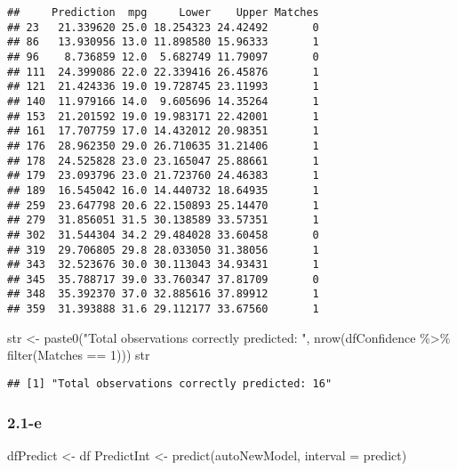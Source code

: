 \documentclass[
]{article}
\newenvironment{Shaded}{\begin{snugshade}}{\end{snugshade}}
\newcommand{\AttributeTok}[1]{\textcolor[rgb]{0.77,0.63,0.00}{#1}}
\newcommand{\DecValTok}[1]{\textcolor[rgb]{0.00,0.00,0.81}{#1}}
\newcommand{\FunctionTok}[1]{\textcolor[rgb]{0.00,0.00,0.00}{#1}}
\newcommand{\NormalTok}[1]{#1}
\newcommand{\OtherTok}[1]{\textcolor[rgb]{0.56,0.35,0.01}{#1}}
\newcommand{\SpecialCharTok}[1]{\textcolor[rgb]{0.00,0.00,0.00}{#1}}
\newcommand{\StringTok}[1]{\textcolor[rgb]{0.31,0.60,0.02}{#1}}
\begin{document}
\begin{verbatim}
##     Prediction  mpg     Lower    Upper Matches
## 23   21.339620 25.0 18.254323 24.42492       0
## 86   13.930956 13.0 11.898580 15.96333       1
## 96    8.736859 12.0  5.682749 11.79097       0
## 111  24.399086 22.0 22.339416 26.45876       1
## 121  21.424336 19.0 19.728745 23.11993       1
## 140  11.979166 14.0  9.605696 14.35264       1
## 153  21.201592 19.0 19.983171 22.42001       1
## 161  17.707759 17.0 14.432012 20.98351       1
## 176  28.962350 29.0 26.710635 31.21406       1
## 178  24.525828 23.0 23.165047 25.88661       1
## 179  23.093796 23.0 21.723760 24.46383       1
## 189  16.545042 16.0 14.440732 18.64935       1
## 259  23.647798 20.6 22.150893 25.14470       1
## 279  31.856051 31.5 30.138589 33.57351       1
## 302  31.544304 34.2 29.484028 33.60458       0
## 319  29.706805 29.8 28.033050 31.38056       1
## 343  32.523676 30.0 30.113043 34.93431       1
## 345  35.788717 39.0 33.760347 37.81709       0
## 348  35.392370 37.0 32.885616 37.89912       1
## 359  31.393888 31.6 29.112177 33.67560       1
\end{verbatim}

\begin{Shaded}
\begin{Highlighting}[]
\NormalTok{str }\OtherTok{\textless{}{-}} \FunctionTok{paste0}\NormalTok{(}\StringTok{"Total observations correctly predicted: "}\NormalTok{, }\FunctionTok{nrow}\NormalTok{(dfConfidence }\SpecialCharTok{\%\textgreater{}\%} \FunctionTok{filter}\NormalTok{(Matches }\SpecialCharTok{==} \DecValTok{1}\NormalTok{)))}
\NormalTok{str}
\end{Highlighting}
\end{Shaded}

\begin{verbatim}
## [1] "Total observations correctly predicted: 16"
\end{verbatim}

\hypertarget{e}{%
\subsubsection{2.1-e}\label{e}}

\begin{Shaded}
\begin{Highlighting}[]
\NormalTok{dfPredict }\OtherTok{\textless{}{-}}\NormalTok{ df}
\NormalTok{PredictInt }\OtherTok{\textless{}{-}} \FunctionTok{predict}\NormalTok{(autoNewModel, }\AttributeTok{interval =} \StringTok{\textquotesingle{}predict\textquotesingle{}}\NormalTok{)}
\end{Highlighting}
\end{Shaded}
\end{document}
